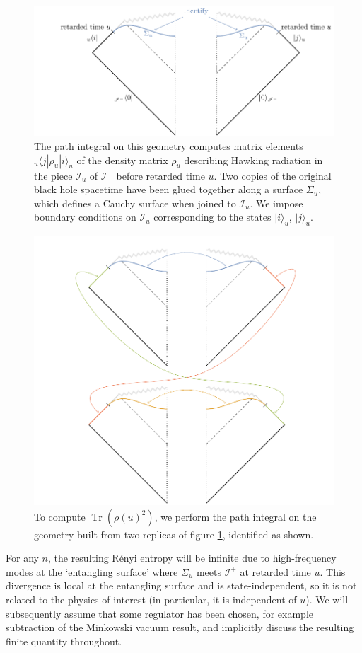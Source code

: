 \documentclass[letterpaper,12pt]{article}
\DeclareMathOperator{\Tr}{Tr}
\newcommand*{\scri}{\mathscr{I}} %
\begin{document}
\begin{figure}
	\centering
	\includegraphics[width=.7\textwidth]{HawkingRhou.pdf}
	\caption{The path integral on this geometry computes matrix elements ${}_u\langle j |\rho_{u} | i \rangle_{u}$ of the density matrix $\rho_{u}$ describing Hawking radiation in the piece $\scri_u$ of $\scri^+$ before retarded time $u$. Two copies of the original black hole spacetime have been glued together along a surface $\Sigma_u$, which defines a Cauchy surface when joined to $\scri_u$.  We impose boundary conditions on $\scri_u$ corresponding to the states $|i \rangle_{u}$, $|j \rangle_{u}$.\label{fig:HawkingRhou}}
\end{figure}
\begin{figure}
	\centering
	\raisebox{110pt}{\scalebox{1.5}{$\Tr(\rho(u)^2) =$}}
	\includegraphics[width=.4\textwidth]{HawkingRho2.pdf}
		\caption{To compute $\Tr(\rho(u)^2)$, we perform the path integral on the geometry built from two replicas of figure \ref{fig:HawkingRhou}, identified as shown.\label{fig:HawkingRenyi}}
\end{figure}

For any $n$, the resulting R\'enyi entropy will be infinite due to high-frequency modes at the `entangling surface' where $\Sigma_u$ meets $\scri^+$ at retarded time $u$. This divergence is local at the entangling surface and is state-independent, so it is not related to the physics of interest (in particular, it is independent of $u$). We will subsequently assume that some regulator has been chosen, for example subtraction of the Minkowski vacuum result, and implicitly discuss the resulting finite quantity throughout.
\end{document}
